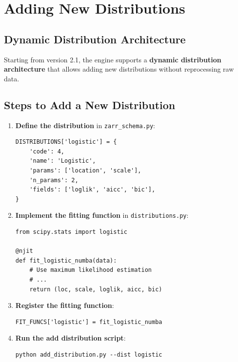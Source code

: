 ﻿\documentclass[12pt,a4paper]{report}
\begin{document}
\section{Adding New Distributions}

\subsection{Dynamic Distribution Architecture}
Starting from version 2.1, the engine supports a \textbf{dynamic distribution architecture} that allows adding new distributions without reprocessing raw data.

\subsection{Steps to Add a New Distribution}
\begin{enumerate}
    \item \textbf{Define the distribution} in \texttt{zarr\_schema.py}:
    \begin{lstlisting}[caption=Adding a New Distribution to Schema]
DISTRIBUTIONS['logistic'] = {
    'code': 4,
    'name': 'Logistic',
    'params': ['location', 'scale'],
    'n_params': 2,
    'fields': ['loglik', 'aicc', 'bic'],
}
    \end{lstlisting}

    \item \textbf{Implement the fitting function} in \texttt{distributions.py}:
    \begin{lstlisting}[caption=Implementing Logistic Fitting]
from scipy.stats import logistic

@njit
def fit_logistic_numba(data):
    # Use maximum likelihood estimation
    # ...
    return (loc, scale, loglik, aicc, bic)
    \end{lstlisting}

    \item \textbf{Register the fitting function}:
    \begin{lstlisting}[caption=Registering the Function]
FIT_FUNCS['logistic'] = fit_logistic_numba
    \end{lstlisting}

    \item \textbf{Run the add distribution script}:
    \begin{lstlisting}[caption=Adding the Distribution]
python add_distribution.py --dist logistic
    \end{lstlisting}
\end{enumerate}
\end{document}
